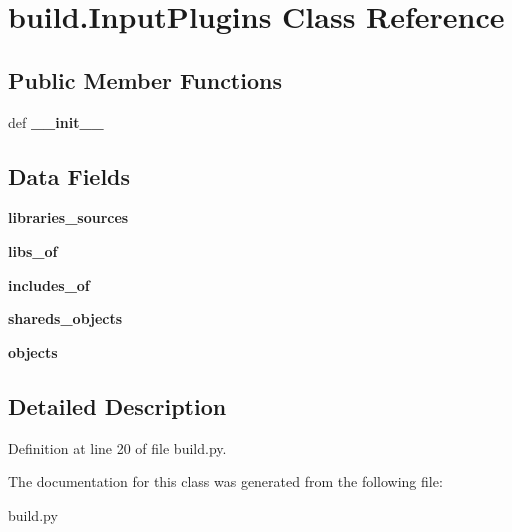 \hypertarget{classbuild_1_1InputPlugins}{\section{build.\-Input\-Plugins \-Class \-Reference}
\label{classbuild_1_1InputPlugins}
}
\subsection*{\-Public \-Member \-Functions}
\begin{DoxyCompactItemize}
\item 
\hypertarget{classbuild_1_1InputPlugins_a9daf25c71f893ee693b455f5c1906080}{def {\bfseries \-\_\-\-\_\-init\-\_\-\-\_\-}}\label{classbuild_1_1InputPlugins_a9daf25c71f893ee693b455f5c1906080}

\end{DoxyCompactItemize}
\subsection*{\-Data \-Fields}
\begin{DoxyCompactItemize}
\item 
\hypertarget{classbuild_1_1InputPlugins_ab4434d33f230cabd0225e32a4b7140e2}{{\bfseries libraries\-\_\-sources}}\label{classbuild_1_1InputPlugins_ab4434d33f230cabd0225e32a4b7140e2}

\item 
\hypertarget{classbuild_1_1InputPlugins_a7441b4969f45a5589d7516237fdf3e89}{{\bfseries libs\-\_\-of}}\label{classbuild_1_1InputPlugins_a7441b4969f45a5589d7516237fdf3e89}

\item 
\hypertarget{classbuild_1_1InputPlugins_aaf27f280f19ba39aaa22d6f4201d2614}{{\bfseries includes\-\_\-of}}\label{classbuild_1_1InputPlugins_aaf27f280f19ba39aaa22d6f4201d2614}

\item 
\hypertarget{classbuild_1_1InputPlugins_a2deef051b57ce38320ef2b5455b1b3a4}{{\bfseries shareds\-\_\-objects}}\label{classbuild_1_1InputPlugins_a2deef051b57ce38320ef2b5455b1b3a4}

\item 
\hypertarget{classbuild_1_1InputPlugins_ac1fce4852aafa244b7ca381be642b53d}{{\bfseries objects}}\label{classbuild_1_1InputPlugins_ac1fce4852aafa244b7ca381be642b53d}

\end{DoxyCompactItemize}


\subsection{\-Detailed \-Description}


\-Definition at line 20 of file build.\-py.



\-The documentation for this class was generated from the following file\-:\begin{DoxyCompactItemize}
\item 
build.\-py\end{DoxyCompactItemize}
